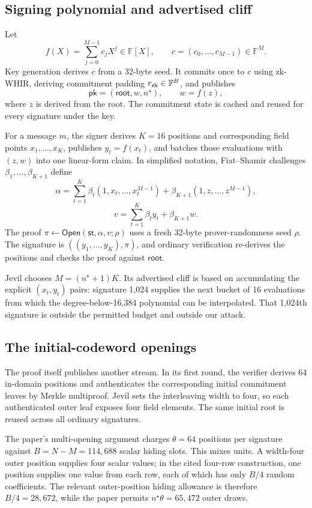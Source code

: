\documentclass[10pt,a4paper]{article}
\newcommand{\F}{\mathbb F}
\newcommand{\Open}{\mathsf{Open}}
\begin{document}
\subsection{Signing polynomial and advertised cliff}

Let
\[
  f(X)=\sum_{j=0}^{M-1} c_jX^j\in\F[X],
  \qquad c=(c_0,\ldots,c_{M-1})\in\F^M.
\]
Key generation derives $c$ from a 32-byte seed. It commits once to $c$ using
zk-WHIR, deriving commitment padding $r_{\rm zk}\in\F^B$, and publishes
\[
  \mathsf{pk}=(\mathsf{root},w,n^\star),
  \qquad w=f(z),
\]
where $z$ is derived from the root. The commitment state is cached and reused
for every signature under the key.

For a message $m$, the signer derives $K=16$ positions and corresponding field
points $x_1,\ldots,x_K$, publishes $y_t=f(x_t)$, and batches those evaluations
with $(z,w)$ into one linear-form claim. In simplified notation, Fiat--Shamir
challenges $\beta_1,\ldots,\beta_{K+1}$ define
\[
  \alpha=\sum_{t=1}^{K}\beta_t(1,x_t,\ldots,x_t^{M-1})
     +\beta_{K+1}(1,z,\ldots,z^{M-1}),
\]
\[
  v=\sum_{t=1}^{K}\beta_ty_t+\beta_{K+1}w.
\]
The proof $\pi\leftarrow\Open(\mathsf{st},\alpha,v;\rho)$ uses a fresh
32-byte prover-randomness seed $\rho$. The signature is
$((y_1,\ldots,y_K),\pi)$, and ordinary verification re-derives the positions and
checks the proof against $\mathsf{root}$.

Jevil chooses $M=(n^\star+1)K$. Its advertised cliff is based on accumulating
the explicit $(x_t,y_t)$ pairs: signature 1,024 supplies the next bucket of 16
evaluations from which the degree-below-16,384 polynomial can be interpolated.
That 1,024th signature is outside the permitted budget and outside our attack.

\subsection{The initial-codeword openings}

The proof itself publishes another stream. In its first round, the verifier
derives 64 in-domain positions and authenticates the corresponding initial
commitment leaves by Merkle multiproof. Jevil sets the interleaving width to
four, so each authenticated outer leaf exposes four field elements. The same
initial root is reused across all ordinary signatures.

The paper's multi-opening argument charges $\theta=64$ positions per signature
against $B=N-M=114{,}688$ scalar hiding slots. This mixes units. A width-four
outer position supplies four scalar values; in the cited four-row construction,
one position supplies one value from each row, each of which has only $B/4$
random coefficients. The relevant outer-position hiding allowance is therefore
$B/4=28{,}672$, while the paper permits $n^\star\theta=65{,}472$ outer draws.
\end{document}
